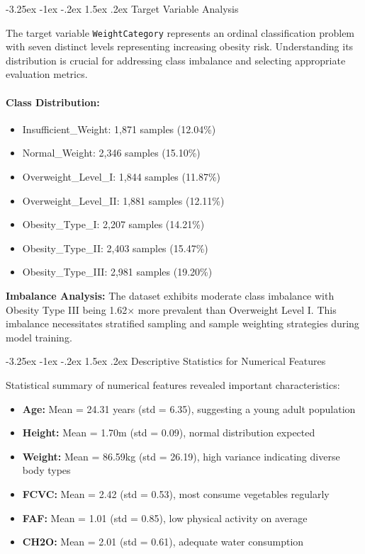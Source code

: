 \documentclass[12pt,a4paper]{article}
\makeatletter
\renewcommand{\subsection}{\@startsection{subsection}{2}{\z@}%
                                   {-3.25ex \@plus -1ex \@minus -.2ex}%
                                   {1.5ex \@plus .2ex}%
                                   {\normalfont\large\bfseries\vspace{0.3\baselineskip}}}
\makeatother
\begin{document}
\subsection{Target Variable Analysis}

The target variable \texttt{WeightCategory} represents an ordinal classification problem with seven distinct levels representing increasing obesity risk. Understanding its distribution is crucial for addressing class imbalance and selecting appropriate evaluation metrics.

\paragraph{Class Distribution:}
\begin{itemize}
    \item Insufficient\_Weight: 1,871 samples (12.04\%)
    \item Normal\_Weight: 2,346 samples (15.10\%)
    \item Overweight\_Level\_I: 1,844 samples (11.87\%)
    \item Overweight\_Level\_II: 1,881 samples (12.11\%)
    \item Obesity\_Type\_I: 2,207 samples (14.21\%)
    \item Obesity\_Type\_II: 2,403 samples (15.47\%)
    \item Obesity\_Type\_III: 2,981 samples (19.20\%)
\end{itemize}

\textbf{Imbalance Analysis:} The dataset exhibits moderate class imbalance with Obesity Type III being 1.62× more prevalent than Overweight Level I. This imbalance necessitates stratified sampling and sample weighting strategies during model training.

\subsection{Descriptive Statistics for Numerical Features}

Statistical summary of numerical features revealed important characteristics:

\begin{itemize}
    \item \textbf{Age:} Mean = 24.31 years (std = 6.35), suggesting a young adult population
    \item \textbf{Height:} Mean = 1.70m (std = 0.09), normal distribution expected
    \item \textbf{Weight:} Mean = 86.59kg (std = 26.19), high variance indicating diverse body types
    \item \textbf{FCVC:} Mean = 2.42 (std = 0.53), most consume vegetables regularly
    \item \textbf{FAF:} Mean = 1.01 (std = 0.85), low physical activity on average
    \item \textbf{CH2O:} Mean = 2.01 (std = 0.61), adequate water consumption
\end{itemize}
\end{document}
